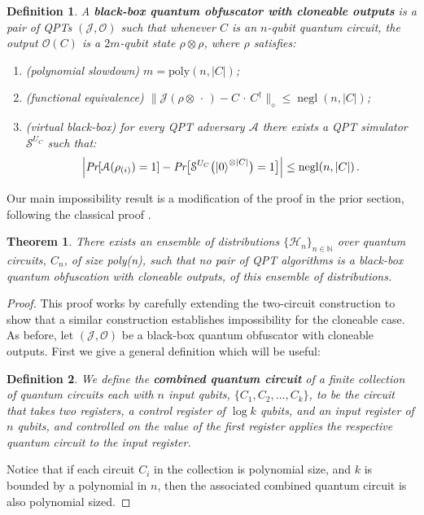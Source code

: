 \documentclass[11pt]{article}
\numberwithin{equation}{section}
\newtheorem{theorem}{Theorem}
\newtheorem{definition}{Definition}
\newcommand{\opn}{\operatorname}
\newcommand{\algo}{\mathcal}
\newcommand{\negl}{\opn{negl}}
\begin{document}
{\begin{definition}\label{blackboxclone}
A \textbf{black-box quantum obfuscator with cloneable outputs} is a pair of QPTs $(\algo J, \algo O)$ such that whenever $C$ is an $n$-qubit quantum circuit, the output $\mathcal{O}(C)$ is a $2m$-qubit state $\rho\otimes\rho$, where  $\rho$ satisfies:
\begin{enumerate}
\item (polynomial slowdown)  $m = \text{poly}(n, |C|)$;
\item (functional equivalence) $\bigl\| \algo J ( \rho \otimes \,\cdot\, ) - C \,\cdot\, C^\dagger \bigr\|_\diamond \leq \negl(n, |C|)$;
\item (virtual black-box) for every QPT adversary $\mathcal A$ there exists a QPT simulator $\mathcal S^{U_C}$ such that:
$$
\Bigl| \emph{Pr}[\mathcal A(\rho_{(i)}) = 1] - \emph{Pr}\bigl[\mathcal S^{U_C}\bigl(\ket{0}^{\otimes |C|}\bigr) = 1\bigr] \Bigr| \leq \negl(n, |C|)\,.
$$
\end{enumerate}
\end{definition}
Our main impossibility result is a modification of the proof in the prior section, following the classical proof \cite{BGIRSVY12}.
\begin{theorem}
There exists an ensemble of distributions $\lbrace\mathcal{H}_n\rbrace_{n\in\mathbb{N}}$ over quantum circuits, $C_n$, of size poly(n), such that no pair of QPT algorithms is a black-box quantum obfuscation with cloneable outputs, of this ensemble of distributions.
\end{theorem}
\begin{proof}
This proof works by carefully extending the two-circuit construction to show that a similar construction establishes impossibility for the cloneable case.  As before, let $(\algo J,\algo O)$ be a black-box quantum obfuscator with cloneable outputs.   
First we give a general definition which will be useful:
\begin{definition}We define the {\bf combined quantum circuit} of a finite collection of quantum circuits each with $n$ input qubits, $\lbrace C_1,C_2,...,C_k \rbrace$, to be the circuit that takes two registers, a control register of $\log{k}$ qubits, and an input register of $n$ qubits, and controlled on the value of the first register applies the respective quantum circuit to the input register.   
\end{definition}

Notice that if each circuit $C_i$ in the collection is polynomial size, and $k$ is bounded by a polynomial in $n$, then the associated combined quantum circuit is also polynomial sized.   


\end{proof}}
\end{document}
